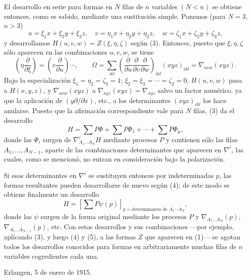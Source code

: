 \documentclass[11pt]{article}
\begin{document}
El desarrollo en serie para formas en $N$ filas de $n$ variables $(N<n)$ se obtiene entonces, como es sabido, mediante una sustitución simple. Ponemos (para $N=3$, $n>3$)
\[
  u=\xi_1x+\xi_2y+\xi_3z,
  \quad v=\eta_1x+\eta_2y+\eta_3z,
  \quad w=\zeta_1x+\zeta_2y+\zeta_3z,
\]
y desarrollamos $H(u,v,w)=Z(\xi,\eta,\zeta)$ según (3). Entonces, puesto que $\xi,\eta,\zeta$ sólo aparecen en las combinaciones $u,v,w$, se tiene
\[
  \left(\eta\frac{\partial}{\partial \xi}\right)=
  \left(v\frac{\partial}{\partial u}\right)\cdots,
  \qquad
  \Omega=\sum_{ikl}\left(\frac{\partial}{\partial u}
  \frac{\partial}{\partial v}
  \frac{\partial}{\partial w}\right)_{ikl}(xyz)_{ikl}
  =\nabla_{uvw}(xyz).
\]
Bajo la especialización $\xi_1=\eta_2=\zeta_3=1$; $\xi_2=\xi_3=\cdots=\zeta_2=0$, $H(u,v,w)$ pasa a $H(x,y,z)$, y $\nabla_{uvw}(xyz)$ a $\nabla_{xyz}(xyz)=\nabla_{xyz}$ salvo un factor numérico, ya que la aplicación de $(y\partial/\partial x)$, etc., a los determinantes $(xyz)_{ikl}$ los hace anularse. Puesto que la afirmación correspondiente vale para $N$ filas, (3) da el desarrollo
\begin{equation}
  H=\sum P\Phi+\sum P\Phi_1+\cdots+\sum P\Phi_\mu,
\tag{4}
\end{equation}
donde las $\Phi_i$ surgen de $\nabla^i_{A_1\ldots A_N}H$ mediante procesos $P$ y contienen sólo las filas $A_1,
\ldots,A_{N-1}$, aparte de las combinaciones determinantes que aparecen en $\nabla^i$, las cuales, como se mencionó, no entran en consideración bajo la polarización.

Si esos determinantes en $\nabla^i$ se sustituyen entonces por indeterminadas $p$, las formas resultantes pueden desarrollarse de nuevo según (4); de este modo se obtiene finalmente un desarrollo
\begin{equation}
  H=\left[\sum P\psi(p)\right]_{p=\text{determinantes de }A_1\cdots A_N},
\tag{5}
\end{equation}
donde las $\psi$ surgen de la forma original mediante los procesos $P$ y $\nabla_{A_1\ldots A_N}(p)$, $\nabla_{A_1\ldots A_{N-1}}(p)$, etc. Con estos desarrollos y sus combinaciones ---por ejemplo, aplicando (3), y luego (4) y (5), a las formas $Z$ que aparecen en (1)--- se agotan todos los desarrollos conocidos para formas en arbitrariamente muchas filas de $n$ variables cogredientes cada una.

Erlangen, 5 de enero de 1915.
\end{document}
